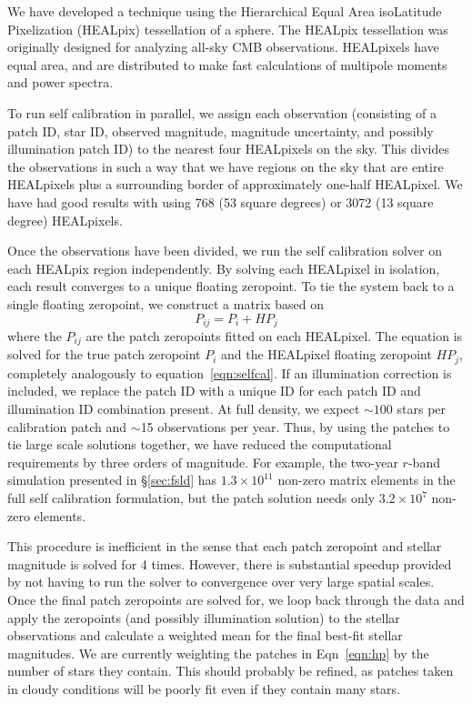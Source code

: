 \documentclass[12pt,preprint]{aastex}
\begin{document}
We have developed a technique using the Hierarchical Equal Area isoLatitude Pixelization (HEALpix) tessellation of a sphere.  The HEALpix tessellation was originally designed for analyzing all-sky CMB observations.  HEALpixels have equal area, and are distributed to make fast calculations of multipole moments and power spectra.  

To run self calibration in parallel, we assign each observation (consisting of a patch ID, star ID, observed magnitude, magnitude uncertainty, and possibly illumination patch ID) to the nearest four HEALpixels on the sky.  This divides the observations in such a way that we have regions on the sky that are entire HEALpixels plus a surrounding border of approximately one-half HEALpixel.  We have had good results with using 768 (53 square degrees) or 3072 (13 square degree) HEALpixels.  

Once the observations have been divided, we run the self calibration solver on each HEALpix region independently.  By solving each HEALpixel in isolation, each result converges to a unique floating zeropoint.  To tie the system back to a single floating zeropoint, we construct a matrix based on
\begin{equation}\label{eqn:hp}
P_{ij} = P_{i} + HP_{j}
\end{equation}
where the $P_{ij}$ are the patch zeropoints fitted on each HEALpixel.  The equation is solved for the true patch zeropoint $P_{i}$ and the HEALpixel floating zeropoint $HP_{j}$, completely analogously to equation~\ref{eqn:selfcal}.  If an illumination correction is included, we replace the patch ID with a unique ID for each patch ID and illumination ID combination present.  At full density, we expect $\sim100$ stars per calibration patch and $\sim$15 observations per year.  Thus, by using the patches to tie large scale solutions together, we have reduced the computational requirements by three orders of magnitude.  For example, the two-year $r$-band simulation presented in \S\ref{sec:fsld} has $1.3\times 10^{11}$  non-zero matrix elements in the full self calibration formulation, but the patch solution needs only $3.2 \times 10^7$ non-zero elements.  

This procedure is inefficient in the sense that each patch zeropoint and stellar magnitude is solved for 4 times.  However, there is substantial speedup provided by not having to run the solver to convergence over very large spatial scales.  Once the final patch zeropoints are solved for, we loop back through the data and apply the zeropoints (and possibly illumination solution) to the stellar observations and calculate a weighted mean for the final best-fit stellar magnitudes.  We are currently weighting the patches in Eqn~\ref{eqn:hp} by the number of stars they contain.  This should probably be refined, as patches taken in cloudy conditions will be poorly fit even if they contain many stars.  
\end{document}

